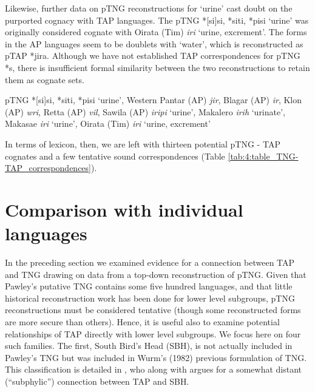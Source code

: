 Likewise, further data on pTNG reconstructions for `urine' cast doubt on the purported cognacy with TAP languages. The pTNG *[si]si, *siti, *pisi `urine' was originally considered cognate with Oirata (Tim) \textit{iri} `urine, excrement'. The forms in the AP languages seem to be doublets with `water', which is reconstructed as pTAP *jira. Although we have not established TAP correspondences for pTNG *s, there is insufficient formal similarity between the two reconstructions to retain them as cognate sets.

\ea%
\label{ex:4:55}
\upshape    pTNG *[si]si, *siti, *pisi `urine', Western Pantar (AP) \textit{jir}, Blagar (AP) \textit{ir}, Klon (AP) \textit{wri}, Retta (AP) \textit{vil}, Sawila (AP) \textit{iripi{\ng}} `urine', Makalero \textit{irih }`urinate', Makasae \textit{iri }`urine', Oirata (Tim) \textit{iri} `urine, excrement'  
\z

In terms of lexicon, then, we are left with thirteen potential pTNG - TAP cognates and a few tentative sound correspondences (Table \ref{tab:4:table_TNG-TAP_correspondences}).

\section{Comparison with individual languages} \label{sec:4:5}
In the preceding section we examined evidence for a connection between TAP and TNG drawing on data from a top-down reconstruction of pTNG. Given that Pawley's putative TNG contains some five hundred languages, and that little historical reconstruction work has been done for lower level subgroups, pTNG reconstructions must be considered tentative (though some reconstructed forms are more secure than others). Hence, it is useful also to examine potential relationships of TAP directly with lower level subgroups. We focus here on four such families. The first, South Bird's Head (SBH), is not actually included in Pawley's TNG but was included in Wurm's (1982) previous formulation of TNG. This classification is detailed in \citet{Voorhoeve1975}, who along with \citet{Stokhof1975} argues for a somewhat distant (``subphylic'') connection between TAP and SBH. \nocite{Wurm1982}

